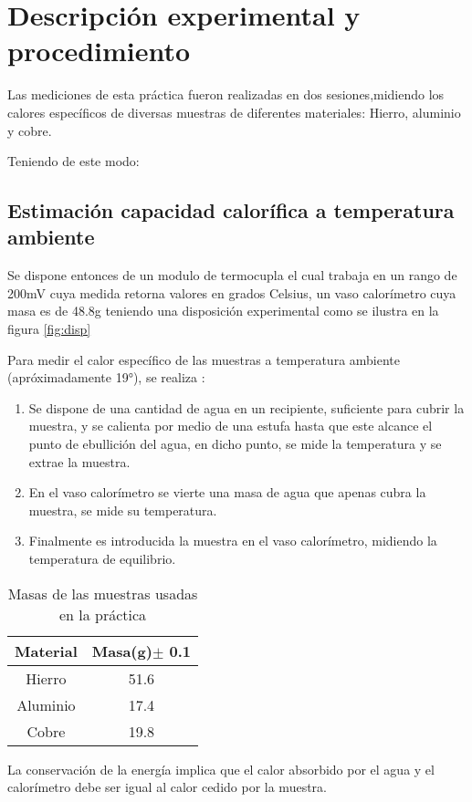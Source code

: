 \section{Descripción experimental y procedimiento}

Las mediciones de esta práctica fueron realizadas en dos sesiones,midiendo los calores específicos de diversas muestras de diferentes materiales: Hierro, aluminio y cobre.

Teniendo de este modo:
\subsection{Estimación capacidad calorífica a temperatura ambiente}
Se dispone entonces de un modulo de termocupla el cual trabaja en un rango de 200mV cuya medida retorna valores en grados Celsius, un vaso calorímetro cuya masa es de 48.8g teniendo una disposición experimental como se ilustra en la figura \ref{fig:disp}

Para medir el calor específico de las muestras a temperatura ambiente (apróximadamente 19°), se realiza :
\begin{enumerate}
    \item Se dispone de una cantidad de agua en un recipiente, suficiente para cubrir la muestra, y se calienta por medio de una estufa hasta que este alcance el punto de ebullición del agua, en dicho punto, se mide la temperatura y se extrae la muestra.
    
   \item En el vaso calorímetro se vierte una masa de agua que apenas cubra la muestra, se mide su temperatura.
     
    \item Finalmente es introducida la muestra en el vaso calorímetro, midiendo la temperatura de equilibrio.
     
\end{enumerate}


\begin{table}[]
    \centering
    \begin{tabular}{|c|c|}
    \hline
         Material&Masa(g)$\pm$ 0.1  \\\hline
         Hierro&51.6\\
         Aluminio&17.4\\
         Cobre&19.8\\
\hline
    \end{tabular}
    \caption{Masas de las muestras usadas en la práctica}
    \label{tab:masas}
\end{table}
La conservación de la energía implica que el calor absorbido por el agua y el calorímetro debe ser igual al calor cedido por la muestra.
    
